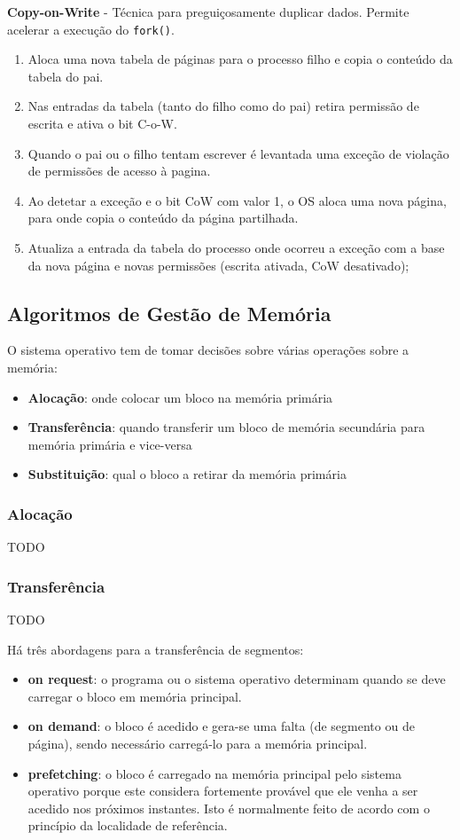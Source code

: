 \documentclass[11pt]{article}
\begin{document}
\textbf{Copy-on-Write} - Técnica para preguiçosamente duplicar dados. Permite acelerar a execução do \lstinline|fork()|.
\begin{enumerate}[topsep=0pt]
    \item Aloca uma nova tabela de páginas para o processo filho e copia o conteúdo da tabela do pai.
    \item Nas entradas da tabela (tanto do filho como do pai) retira permissão de escrita e ativa o bit C-o-W.
    \item Quando o pai ou o filho tentam escrever é levantada uma exceção de violação de permissões de acesso à pagina.
    \item Ao detetar a exceção e o bit CoW com valor 1, o OS aloca uma nova página, para onde copia o conteúdo da página partilhada.
    \item Atualiza a entrada da tabela do processo onde ocorreu a exceção com a base da nova página e novas permissões (escrita ativada, CoW desativado);
\end{enumerate}

\subsection{Algoritmos de Gestão de Memória}

O sistema operativo tem de tomar decisões sobre várias operações sobre a memória:
\begin{itemize}
    \item \textbf{Alocação}: onde colocar um bloco na memória primária
    \item \textbf{Transferência}: quando transferir um bloco de memória secundária para memória primária e vice-versa
    \item \textbf{Substituição}: qual o bloco a retirar da memória primária
\end{itemize}

\subsubsection{Alocação}

TODO

\subsubsection{Transferência}

TODO

Há três abordagens para a transferência de segmentos:
\begin{itemize}
    \item \textbf{on request}: o programa ou o sistema operativo determinam quando se deve carregar o bloco em memória principal.
    \item \textbf{on demand}: o bloco é acedido e gera-se uma falta (de segmento ou de página), sendo necessário carregá-lo para a memória principal.
    \item \textbf{prefetching}: o bloco é carregado na memória principal pelo sistema operativo porque este considera fortemente provável que ele venha a ser acedido nos próximos instantes. Isto é normalmente feito de acordo com o princípio da localidade de referência.
\end{itemize}
\end{document}

